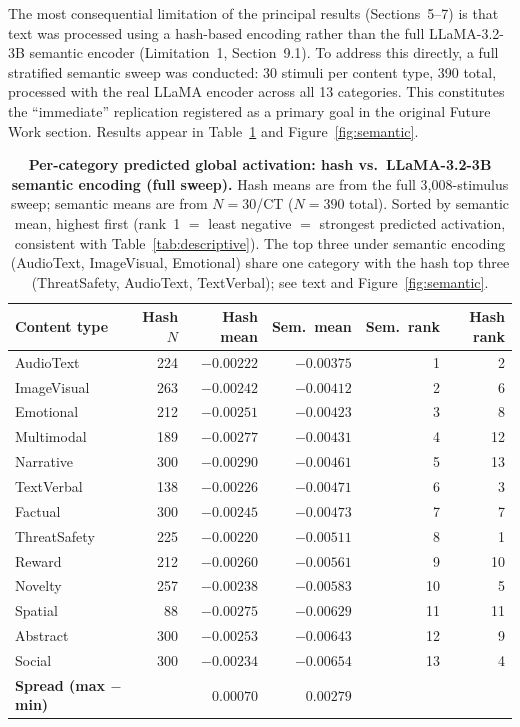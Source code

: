 \documentclass[11pt,letterpaper]{article}
\numberwithin{equation}{section}
\begin{document}
The most consequential limitation of the principal results (Sections~5--7) is that text was processed using a hash-based encoding rather than the full LLaMA-3.2-3B semantic encoder (Limitation~1, Section~9.1). To address this directly, a full stratified semantic sweep was conducted: 30 stimuli per content type, 390 total, processed with the real LLaMA encoder across all 13 categories. This constitutes the ``immediate'' replication registered as a primary goal in the original Future Work section. Results appear in Table~\ref{tab:semantic} and Figure~\ref{fig:semantic}.

\begin{table}[ht]
\centering
\small
\caption{\textbf{Per-category predicted global activation: hash vs.\ LLaMA-3.2-3B semantic encoding (full sweep).} Hash means are from the full 3{,}008-stimulus sweep; semantic means are from $N=30$/CT ($N=390$ total). Sorted by semantic mean, highest first (rank~1 $=$ least negative $=$ strongest predicted activation, consistent with Table~\ref{tab:descriptive}). The top three under semantic encoding (AudioText, ImageVisual, Emotional) share one category with the hash top three (ThreatSafety, AudioText, TextVerbal); see text and Figure~\ref{fig:semantic}.}
\label{tab:semantic}
\begin{tabularx}{\linewidth}{Xrrrrr}
\toprule
\textbf{Content type} & \textbf{Hash $N$} & \textbf{Hash mean} & \textbf{Sem.\ mean} & \textbf{Sem.\ rank} & \textbf{Hash rank} \\
\midrule
AudioText      & 224 & $-0.00222$ & $-0.00375$ &  1 &  2 \\
ImageVisual    & 263 & $-0.00242$ & $-0.00412$ &  2 &  6 \\
Emotional      & 212 & $-0.00251$ & $-0.00423$ &  3 &  8 \\
Multimodal     & 189 & $-0.00277$ & $-0.00431$ &  4 & 12 \\
Narrative      & 300 & $-0.00290$ & $-0.00461$ &  5 & 13 \\
TextVerbal     & 138 & $-0.00226$ & $-0.00471$ &  6 &  3 \\
Factual        & 300 & $-0.00245$ & $-0.00473$ &  7 &  7 \\
ThreatSafety   & 225 & $-0.00220$ & $-0.00511$ &  8 &  1 \\
Reward         & 212 & $-0.00260$ & $-0.00561$ &  9 & 10 \\
Novelty        & 257 & $-0.00238$ & $-0.00583$ & 10 &  5 \\
Spatial        &  88 & $-0.00275$ & $-0.00629$ & 11 & 11 \\
Abstract       & 300 & $-0.00253$ & $-0.00643$ & 12 &  9 \\
Social         & 300 & $-0.00234$ & $-0.00654$ & 13 &  4 \\
\midrule
\textbf{Spread (max $-$ min)} & & $0.00070$ & $0.00279$ & & \\
\bottomrule
\end{tabularx}
\end{table}
\end{document}
